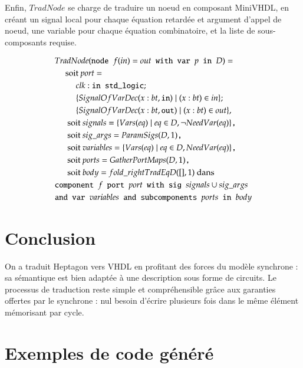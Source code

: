 \documentclass[9pt,a4paper]{article}
\newcommand{\TODO}[1]{}
\newcommand{\LANG}{Heptagon}
\newcommand{\p}[0]{\; \vert \;}
\newcommand{\mybox}[1]{\mbox{\tt{#1}}}
\newcommand{\bl}[0]{\hspace{0.45cm}}
\begin{document}
Enfin, $TradNode$ se charge de traduire un noeud en composant MiniVHDL, en
créant un signal local pour chaque équation retardée et argument d'appel de
noeud, une variable pour chaque équation combinatoire, et la liste de
sous-composants requise.

\begin{align*}
  & TradNode(\mybox{node } f(in) = out \mybox{ with var } p \mybox{ in } D) = \\
  & \bl \mbox{soit } port = \\
  & \bl \bl clk : \mybox{in std\_logic}; \\
  & \bl \bl \{ SignalOfVarDec(x : bt, \mybox{in}) \p (x : bt) \in in \}; \\
  & \bl \bl \{ SignalOfVarDec(x : bt, \mybox{out}) \p (x : bt) \in out \}, \\
  & \bl \mbox{ soit } signals = \{ \V{eq} \p eq \in D, \neg \NV{eq} \}
  \mybox{,} \\
  & \bl \mbox{ soit } sig\_args = \PS{D}{1} \mybox{,} \\
  & \bl \mbox{ soit } variables = \{ \V{eq} \p eq \in D, \NV{eq} \} \mybox{,} \\
  & \bl \mbox{ soit } ports = \GPM{D}{1} \mybox{,} \\
  & \bl \mbox{ soit } body = fold\_right TradEq D ([], 1) \mbox{ dans} \\
  & \mybox{component } f \mybox{ port } port \mybox{ with sig } signals \cup
  sig\_args \\
  & \mybox{and var } variables \mybox{ and subcomponents } ports \mybox{ in }
  body
\end{align*}

\section{Conclusion}

\TODO{À enrichir}

On a traduit \LANG{} vers VHDL en profitant des forces du modèle synchrone : sa
sémantique est bien adaptée à une description sous forme de circuits. Le
processus de traduction reste simple et compréhensible grâce aux garanties
offertes par le synchrone : nul besoin d'écrire plusieurs fois dans le même
élément mémorisant par cycle.

\appendix

\section{Exemples de code généré}
\end{document}
